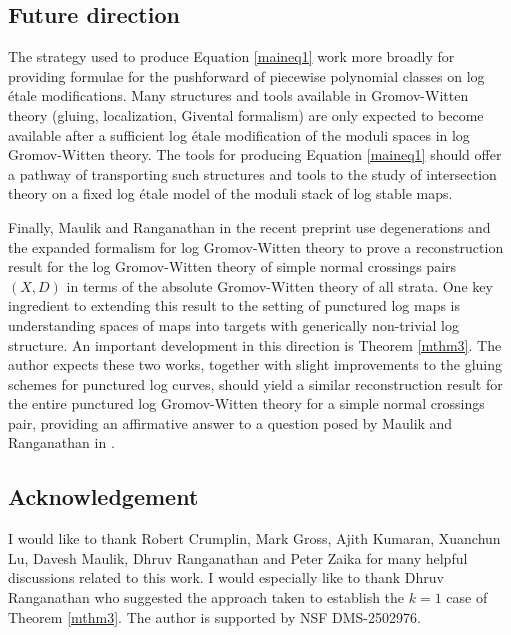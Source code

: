 \documentclass[12pt, oneside]{amsart}   	%
\newcounter{thm}
\numberwithin{equation}{section}
\numberwithin{thm}{section}
\numberwithin{figure}{section}
\begin{document}
\subsection{Future direction}

The strategy used to produce Equation \ref{maineq1} work more broadly for providing formulae for the pushforward of piecewise polynomial classes on log \'etale modifications. Many structures and tools available in Gromov-Witten theory (gluing, localization, Givental formalism) are only expected to become available after a sufficient log \'etale modification of the moduli spaces in log Gromov-Witten theory. The tools for producing Equation \ref{maineq1} should offer a pathway of transporting such structures and tools to the study of intersection theory on a fixed log \'etale model of the moduli stack of log stable maps.

Finally, Maulik and Ranganathan in the recent preprint \cite{MRrecon} use degenerations and the expanded formalism for log Gromov-Witten theory to prove a reconstruction result for the log Gromov-Witten theory of simple normal crossings pairs $(X,D)$ in terms of the absolute Gromov-Witten theory of all strata. One key ingredient to extending this result to the setting of punctured log maps is understanding spaces of maps into targets with generically non-trivial log structure. An important development in this direction is Theorem \ref{mthm3}. The author expects these two works, together with slight improvements to the gluing schemes for punctured log curves, should yield a similar reconstruction result for the entire punctured log Gromov-Witten theory for a simple normal crossings pair, providing an affirmative answer to a question posed by Maulik and Ranganathan in \cite{MRrecon}. 

\subsection{Acknowledgement}
I would like to thank Robert Crumplin, Mark Gross, Ajith Kumaran, Xuanchun Lu, Davesh Maulik, Dhruv Ranganathan and Peter Zaika for many helpful discussions related to this work. I would especially like to thank Dhruv Ranganathan who suggested the approach taken to establish the $k=1$ case of Theorem \ref{mthm3}. The author is supported by NSF DMS-2502976.
\end{document}
